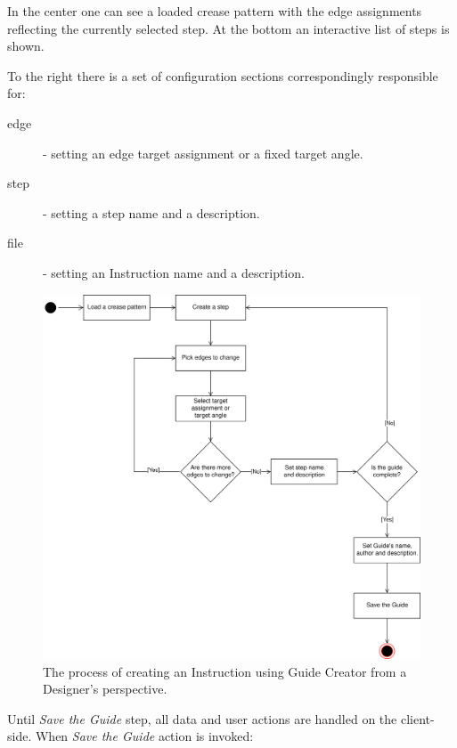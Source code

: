 In the center one can see a loaded crease pattern with the edge assignments reflecting the currently selected step. At the bottom an interactive list of steps is shown.

\medskip

To the right there is a set of configuration sections correspondingly responsible for: \begin{description}
	\item[edge] - setting an edge target assignment or a fixed target angle.
	\item[step] - setting a step name and a description.
	\item[file] - setting an Instruction name and a description.
\end{description}

\medskip

\begin{figure}[H]
  \caption{The process of creating an Instruction using Guide Creator from a Designer's perspective.}
  \label{3-designer-creator-flow}
  \centering
    \includegraphics[width=\textwidth]{assets/3-designer-creator-flow.png}
\end{figure}

Until \textit{Save the Guide} step, all data and user actions are handled on the client-side. When \textit{Save the Guide} action is invoked:

